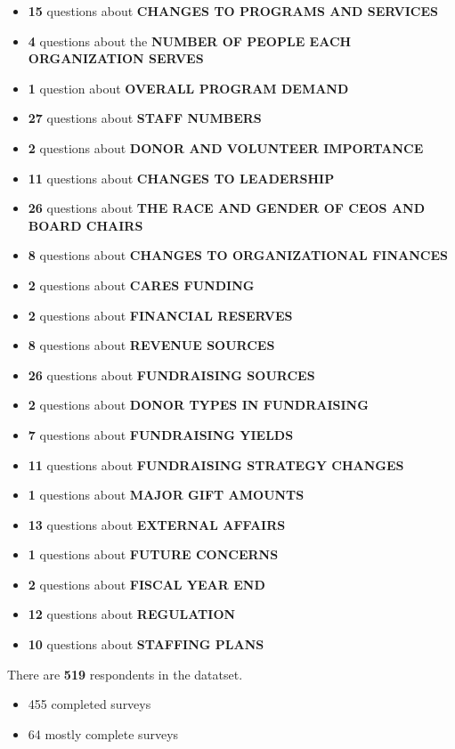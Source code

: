 \documentclass[
  letterpaper,
]{scrbook}
\providecommand{\tightlist}{%
  \setlength{\itemsep}{0pt}\setlength{\parskip}{0pt}}\usepackage{longtable,booktabs,array}
\begin{document}
\begin{itemize}
\tightlist
\item
  \textbf{15} questions about \textbf{CHANGES TO PROGRAMS AND SERVICES}
\item
  \textbf{4} questions about the \textbf{NUMBER OF PEOPLE EACH
  ORGANIZATION SERVES}
\item
  \textbf{1} question about \textbf{OVERALL PROGRAM DEMAND}
\item
  \textbf{27} questions about \textbf{STAFF NUMBERS}
\item
  \textbf{2} questions about \textbf{DONOR AND VOLUNTEER IMPORTANCE}
\item
  \textbf{11} questions about \textbf{CHANGES TO LEADERSHIP}
\item
  \textbf{26} questions about \textbf{THE RACE AND GENDER OF CEOS AND
  BOARD CHAIRS}
\item
  \textbf{8} questions about \textbf{CHANGES TO ORGANIZATIONAL FINANCES}
\item
  \textbf{2} questions about \textbf{CARES FUNDING}
\item
  \textbf{2} questions about \textbf{FINANCIAL RESERVES}
\item
  \textbf{8} questions about \textbf{REVENUE SOURCES}
\item
  \textbf{26} questions about \textbf{FUNDRAISING SOURCES}
\item
  \textbf{2} questions about \textbf{DONOR TYPES IN FUNDRAISING}
\item
  \textbf{7} questions about \textbf{FUNDRAISING YIELDS}
\item
  \textbf{11} questions about \textbf{FUNDRAISING STRATEGY CHANGES}
\item
  \textbf{1} questions about \textbf{MAJOR GIFT AMOUNTS}
\item
  \textbf{13} questions about \textbf{EXTERNAL AFFAIRS}\\
\item
  \textbf{1} questions about \textbf{FUTURE CONCERNS}
\item
  \textbf{2} questions about \textbf{FISCAL YEAR END}
\item
  \textbf{12} questions about \textbf{REGULATION}
\item
  \textbf{10} questions about \textbf{STAFFING PLANS}
\end{itemize}

There are \textbf{519} respondents in the datatset.

\begin{itemize}
\tightlist
\item
  455 completed surveys
\item
  64 mostly complete surveys
\end{itemize}
\end{document}
